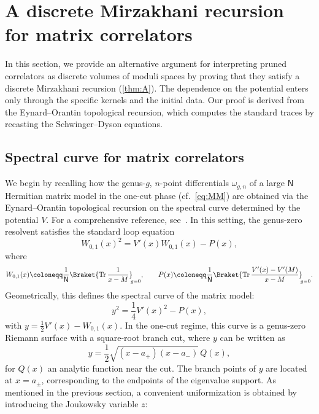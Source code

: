 \documentclass[a4paper,11pt,english]{article}
\theoremstyle{plain}
\theoremstyle{definition}
\theoremstyle{plain}
\DeclareMathOperator{\Tr}{Tr}
\newcommand{\ms}[1]{\mathsf{#1}}
\begin{document}
\section{A discrete Mirzakhani recursion for matrix correlators}
\label{sec:discrete:rec}
In this section, we provide an alternative argument for interpreting pruned correlators as discrete volumes of moduli spaces by proving that they satisfy a discrete Mirzakhani recursion (\cref{thm:A}). The dependence on the potential enters only through the specific kernels and the initial data. Our proof is derived from the Eynard--Orantin topological recursion, which computes the standard traces by recasting the Schwinger--Dyson equations.

\subsection{Spectral curve for matrix correlators}
We begin by recalling how the genus-$g$, $n$-point differentials $\omega_{g,n}$ of a large $\ms{N}$ Hermitian matrix model in the one-cut phase (cf.~\cref{eq:MM}) are obtained via the Eynard--Orantin topological recursion on the spectral curve determined by the potential $V$. For a comprehensive reference, see~\cite{Eyn16,EKR15}. In this setting, the genus-zero resolvent satisfies the standard loop equation
\begin{equation}
    W_{0,1}(x)^2 = V'(x) W_{0,1}(x) - P(x),
\end{equation}
where
\begin{equation}\label{eq:resolvent}
    W_{0,1}(x) \coloneqq \frac{1}{\ms{N}}
    \Braket{ \Tr \frac{1}{x - M} }_{\!\!g=0},
    \qquad
    P(x) \coloneqq \frac{1}{\ms{N}} 
    \Braket{ \Tr \frac{V'(x) - V'(M)}{x - M} }_{\!\!g=0}.
\end{equation}
Geometrically, this defines the spectral curve of the matrix model:
\begin{equation}
    y^2 = \frac{1}{4} V'(x)^2 - P(x),
\end{equation}
with $y = \tfrac{1}{2} V'(x) - W_{0,1}(x)$. In the one-cut regime, this curve is a genus-zero Riemann surface with a square-root branch cut, where $y$ can be written as
\begin{equation}
    y = \frac{1}{2} \sqrt{(x-a_+)(x-a_-)} \, Q(x),
\end{equation}
for $Q(x)$ an analytic function near the cut.
The branch points of $y$ are located at $x = a_{\pm}$, corresponding to the endpoints of the eigenvalue support. As mentioned in the previous section, a convenient uniformization is obtained by introducing the Joukowsky variable $z$:
\end{document}
